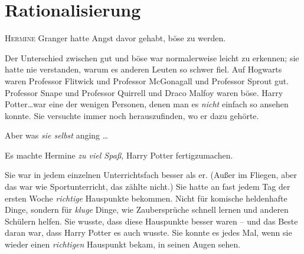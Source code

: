 \chapter{Rationalisierung}


\lettrine{H}{ermine} Granger hatte Angst davor gehabt, böse zu werden.

\hplettrineextrapara
Der Unterschied zwischen gut und böse war normalerweise leicht zu erkennen; sie hatte nie verstanden, warum es anderen Leuten so schwer fiel. Auf Hogwarts waren Professor Flitwick und Professor McGonagall und Professor Sprout gut. Professor Snape und Professor Quirrell und Draco Malfoy waren böse. Harry Potter…war eine der wenigen Personen, denen man es \emph{nicht} einfach so ansehen konnte. Sie versuchte immer noch herauszufinden, wo er dazu gehörte.

Aber was \emph{sie selbst} anging …

Es machte Hermine \emph{zu viel Spaß}, Harry Potter fertigzumachen.

Sie war in jedem einzelnen Unterrichtsfach besser als er. (Außer im Fliegen, aber das war wie Sportunterricht, das zählte nicht.) Sie hatte an fast jedem Tag der ersten Woche \emph{richtige} Hauspunkte bekommen. Nicht für komische heldenhafte Dinge, sondern für \emph{kluge} Dinge, wie Zaubersprüche schnell lernen und anderen Schülern helfen. Sie wusste, dass diese Hauspunkte besser waren – und das Beste daran war, dass Harry Potter es auch wusste. Sie konnte es jedes Mal, wenn sie wieder einen \emph{richtigen} Hauspunkt bekam, in seinen Augen sehen.

